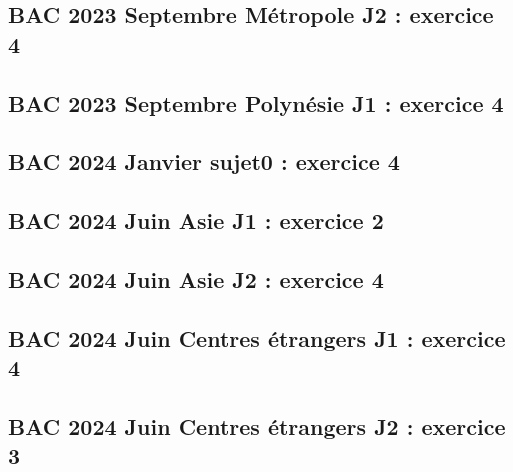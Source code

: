 \documentclass[lang=fr,edition=teacher,layout=sheet]{mxbook}
\begin{document}
\begingroup\endgroup
\par\bigskip
{}\subsection*{BAC 2023 Septembre Métropole J2 : exercice 4}
\begingroup\endgroup
\par\bigskip
{}\subsection*{BAC 2023 Septembre Polynésie J1 : exercice 4}
\begingroup\endgroup
\par\bigskip
{}\subsection*{BAC 2024 Janvier sujet0 : exercice 4}
\begingroup\endgroup
\par\bigskip
{}\subsection*{BAC 2024 Juin Asie J1 : exercice 2}
\begingroup\endgroup
\par\bigskip
{}\subsection*{BAC 2024 Juin Asie J2 : exercice 4}
\begingroup\endgroup
\par\bigskip
{}\subsection*{BAC 2024 Juin Centres étrangers J1 : exercice 4}
\begingroup\endgroup
\par\bigskip
{}\subsection*{BAC 2024 Juin Centres étrangers J2 : exercice 3}
\end{document}
